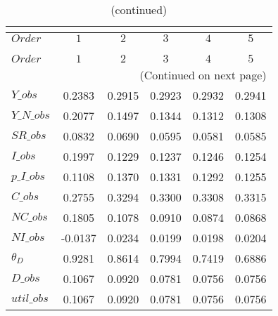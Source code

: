  
\begin{center}
\begin{longtable}{lccccc} 
\caption{COEFFICIENTS OF AUTOCORRELATION}\\
 \label{Table:th_autocorr_matrix}\\
\toprule 
$Order       $	 & 	 $         1$	 & 	 $         2$	 & 	 $         3$	 & 	 $         4$	 & 	 $         5$\\
\midrule \endfirsthead 
\caption{(continued)}\\
 \toprule \\ 
$Order       $	 & 	 $         1$	 & 	 $         2$	 & 	 $         3$	 & 	 $         4$	 & 	 $         5$\\
\midrule \endhead 
\midrule \multicolumn{6}{r}{(Continued on next page)} \\ \bottomrule \endfoot 
\bottomrule \endlastfoot 
$Y\_obs      $	 & 	    0.2383	 & 	    0.2915	 & 	    0.2923	 & 	    0.2932	 & 	    0.2941 \\ 
$Y\_N\_obs   $	 & 	    0.2077	 & 	    0.1497	 & 	    0.1344	 & 	    0.1312	 & 	    0.1308 \\ 
$SR\_obs     $	 & 	    0.0832	 & 	    0.0690	 & 	    0.0595	 & 	    0.0581	 & 	    0.0585 \\ 
$I\_obs      $	 & 	    0.1997	 & 	    0.1229	 & 	    0.1237	 & 	    0.1246	 & 	    0.1254 \\ 
$p\_I\_obs   $	 & 	    0.1108	 & 	    0.1370	 & 	    0.1331	 & 	    0.1292	 & 	    0.1255 \\ 
$C\_obs      $	 & 	    0.2755	 & 	    0.3294	 & 	    0.3300	 & 	    0.3308	 & 	    0.3315 \\ 
$NC\_obs     $	 & 	    0.1805	 & 	    0.1078	 & 	    0.0910	 & 	    0.0874	 & 	    0.0868 \\ 
$NI\_obs     $	 & 	   -0.0137	 & 	    0.0234	 & 	    0.0199	 & 	    0.0198	 & 	    0.0204 \\ 
${\theta_D}  $	 & 	    0.9281	 & 	    0.8614	 & 	    0.7994	 & 	    0.7419	 & 	    0.6886 \\ 
$D\_obs      $	 & 	    0.1067	 & 	    0.0920	 & 	    0.0781	 & 	    0.0756	 & 	    0.0756 \\ 
$util\_obs   $	 & 	    0.1067	 & 	    0.0920	 & 	    0.0781	 & 	    0.0756	 & 	    0.0756 \\ 
\end{longtable}
 \end{center}
